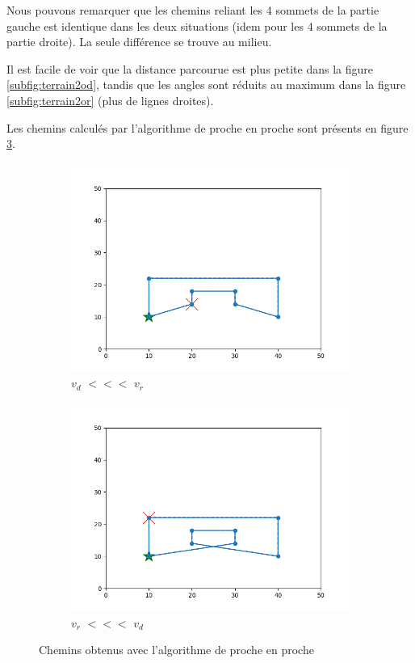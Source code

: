 \documentclass[12pt]{article}
\begin{document}
    Nous pouvons remarquer que les chemins reliant les 4 sommets de la partie gauche est identique dans les deux situations (idem pour les 4 sommets de la partie droite). La seule différence se trouve au milieu.

    Il est facile de voir que la distance parcourue est plus petite dans la figure \ref{subfig:terrain2od}, tandis que les angles sont réduits au maximum dans la figure \ref{subfig:terrain2or} (plus de lignes droites).

    Les chemins calculés par l'algorithme de proche en proche sont présents en figure \ref{fig:terrain2close}.

    \begin{figure}[H]
      \centering
      \begin{subfigure}{0.35\textwidth}
        \centering
        \includegraphics[width=\linewidth]{img/2cd}
        \caption{$v_d$ $<<<$ $v_r$}
        \label{subfig:terrain3mvt}
      \end{subfigure}
      \hfill
      \begin{subfigure}{0.35\textwidth}
        \centering
        \includegraphics[width=\linewidth]{img/2cr}
        \caption{$v_r$ $<<<$ $v_d$}
        \label{subfig:terrain3rot}
      \end{subfigure}
      \caption{Chemins obtenus avec l'algorithme de proche en proche}
      \label{fig:terrain2close}
    \end{figure}
\end{document}
